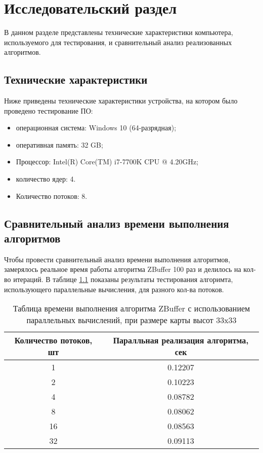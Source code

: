 \chapter{Исследовательский раздел}
В данном разделе представлены технические характеристики компьютера, используемого для тестирования, и сравнительный анализ реализованных алгоритмов.
 \section{Технические характеристики}

Ниже приведены технические характеристики устройства, на котором было проведено тестирование ПО:

\begin{itemize}
	\item операционная система: Windows 10 (64-разрядная);
	\item оперативная память: 32 GB;
	\item Процессор: Intel(R) Core(TM) i7-7700K CPU @ 4.20GHz;
	\item количество ядер: 4.
	\item Количество потоков: 8.
\end{itemize}

\section{Сравнительный анализ времени выполнения алгоритмов}
Чтобы провести сравнительный анализ времени выполнения алгоритмов, замерялось реальное время работы алгоритма ZBuffer 100 раз и делилось на кол-во итераций. В таблице \ref{ZBufferWithThreadsTable} показаны результаты тестирования алгоримта, использующего параллельные вычисления, для разного кол-ва потоков.

 \begin{table} [h!]
	\caption{Таблица времени выполнения алгоритма ZBuffer с использованием параллельных вычислений, при размере карты высот 33x33}
	\label{ZBufferWithThreadsTable}
	\begin{center}
		\begin{tabular}{|c c|} 
			\hline
			Количество потоков, шт & Паралльная реализация алгоритма, сек \\
			\hline
			1 & 0.12207\\
			\hline
			2 & 0.10223\\
			\hline
			4 & 0.08782\\
			\hline
			8 & 0.08062 \\
			\hline
			16 & 0.08563 \\
			\hline
			32 & 0.09113 \\
			\hline
		\end{tabular}
	\end{center}
\end{table}

